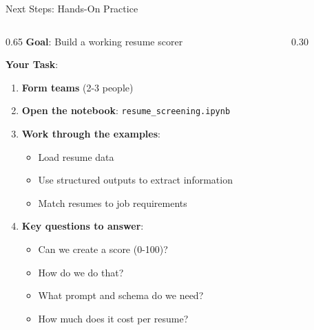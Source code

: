 \documentclass[aspectratio=169]{beamer}
\begin{document}
\begin{frame}{Next Steps: Hands-On Practice}
\begin{columns}[T]
\begin{column}{0.65\textwidth}
\textbf{Goal}: Build a working resume scorer
\vspace{0.2cm}

\textbf{Your Task}:
\begin{enumerate}
    \item \textbf{Form teams} (2-3 people)
    \item \textbf{Open the notebook}: \texttt{resume\_screening.ipynb}
    \item \textbf{Work through the examples}:
    \begin{itemize}
        \item Load resume data
        \item Use structured outputs to extract information
        \item Match resumes to job requirements
    \end{itemize}
    \item \textbf{Key questions to answer}:
    \begin{itemize}
        \item Can we create a score (0-100)?
        \item How do we do that?
        \item What prompt and schema do we need?
        \item How much does it cost per resume?
    \end{itemize}
\end{enumerate}
\end{column}

\begin{column}{0.30\textwidth}
\vspace{1cm}
\end{column}
\end{columns}
\end{frame}
\end{document}
